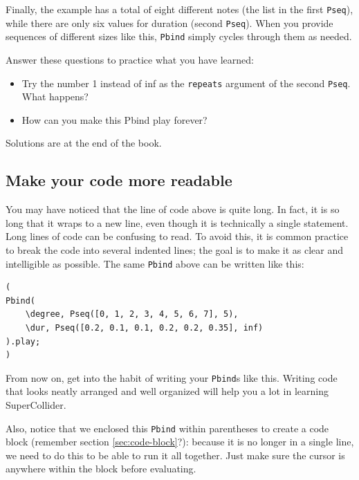 Finally, the example has a total of eight different notes (the list in the first \texttt{Pseq}), while there are only six values for duration (second \texttt{Pseq}). When you provide sequences of different sizes like this, \texttt{Pbind} simply cycles through them as needed.

Answer these questions to practice what you have learned:
\begin{itemize}
\item Try the number 1 instead of inf as the \texttt{repeats} argument of the second \texttt{Pseq}. What happens?
\item How can you make this Pbind play forever?
\end{itemize}

Solutions are at the end of the book.

\subsection{Make your code more readable}

You may have noticed that the line of code above is quite long. In fact, it is so long that it wraps to a new line, even though it is technically a single statement. Long lines of code can be confusing to read. To avoid this, it is common practice to break the code into several indented lines; the goal is to make it as clear and intelligible as possible. The same \texttt{Pbind} above can be written like this:

\begin{lstlisting}[style=SuperCollider-IDE, basicstyle=\scttfamily\footnotesize]
(
Pbind(
	\degree, Pseq([0, 1, 2, 3, 4, 5, 6, 7], 5),
	\dur, Pseq([0.2, 0.1, 0.1, 0.2, 0.2, 0.35], inf)
).play;
)
\end{lstlisting}

From now on, get into the habit of writing your \texttt{Pbind}s like this. Writing code that looks neatly arranged and well organized will help you a lot in learning SuperCollider.

Also, notice that we enclosed this \texttt{Pbind} within parentheses to create a code block (remember section \ref{sec:code-block}?): because it is no longer in a single line, we need to do this to be able to run it all together. Just make sure the cursor is anywhere within the block before evaluating.



